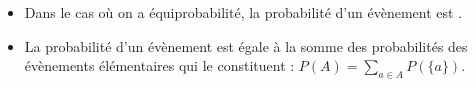 \TCDLessonStyleOff
\begin{fiche}
	\begin{prop}
		\begin{itemize}
			\item Dans le cas o\`u on a \'equiprobabilit\'e, la probabilit\'e d'un \'ev\`enement est
				.
			\item 
				La probabilit\'e d'un \'ev\`enement est \'egale \`a la somme des probabilit\'es des \'ev\`enements \'el\'ementaires qui le constituent :
				$\displaystyle{P(A) = \sum_{a \in A} P(\{a\})}$.

\end{itemize}
\end{prop}
\end{fiche}
